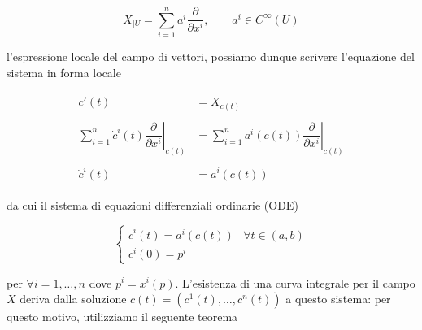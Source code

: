 \begin{equation}
	X_{|U} = \sum_{i=1}^{n} a^{i} \dfrac{\partial}{\partial x^{i}}, \qquad a^{i} \in C^{\infty}(U)
\end{equation}

l'espressione locale del campo di vettori, possiamo dunque scrivere l'equazione del sistema in forma locale

\begin{align}
	\begin{split}
		c'(t) &= X_{c(t)}\\\\
		\sum_{i=1}^{n} \dot{c}^{i}(t) \left. \dfrac{\partial}{\partial x^{i}} \right|_{c(t)} &= \sum_{i=1}^{n} a^{i}(c(t)) \left. \dfrac{\partial}{\partial x^{i}} \right|_{c(t)}\\\\
		\dot{c}^{i}(t) &= a^{i}(c(t))
	\end{split}
\end{align}

da cui il sistema di equazioni differenziali ordinarie (ODE)

\begin{equation}
	\begin{cases}
		\dot{c}^{i}(t) = a^{i}(c(t)) & \forall t \in (a,b)\\
		c^{i}(0) = p^{i}
	\end{cases}
\end{equation}

per $ \forall i=1,\dots,n $ dove $ p^{i} = x^{i} (p) $. L'esistenza di una curva integrale per il campo $ X $ deriva dalla soluzione $ c(t) = (c^{1}(t),\dots,c^{n}(t)) $ a questo sistema: per questo motivo, utilizziamo il seguente teorema

